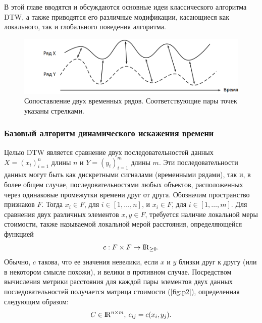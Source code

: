\documentclass[a4paper, 14pt]{extarticle}
\numberwithin{figure}{subsection}
\let\oldautoref\autoref
\renewcommand{\autoref}[1]{(\oldautoref{#1})}
\numberwithin{equation}{subsection}
\begin{document}
В этой главе вводятся и обсуждаются основные идеи классического алгоритма DTW, а также приводятся его различные модификации, касающиеся как локального, так и глобального поведения алгоритма.

\begin{figure}[h]
\centering
\includegraphics[width=15cm]{p1.png}
\caption{Сопоставление двух временных рядов. Соответствующие пары точек указаны стрелками.}
\label{fig:p1}
\end{figure}

\subsubsection{Базовый алгоритм динамического искажения времени}
Целью DTW является сравнение двух последовательностей данных $X = (x_i)_{i=1}^n$ длины $n$ и $Y = (y_i)_{i=1}^m$ длины $m$. Эти последовательности данных могут быть как дискретными сигналами (временными рядами), так и, в более общем случае, последовательностями любых объектов, расположенных через одинаковые промежутки времени друг от друга. Обозначим пространство признаков $F$. Тогда $x_i \in F$, для $i \in [1, \dots, n]$, и $x_i \in F$, для $i \in [1, \dots, m]$. Для сравнения двух различных элементов $x, y \in F$, требуется наличие локальной меры стоимости, также называемой локальной мерой расстояния, определяющейся функцией
\begin{equation}
	c: F \times F \rightarrow {\rm I\!R}_{\ge 0}.
\end{equation}
Обычно, $c$ такова, что ее значения невелики, если $x$ и $y$ близки друг к другу (или в некотором смысле похожи), и велики в противном случае. Посредством вычисления метрики расстояния для каждой пары элементов двух данных последовательностей получается матрица стоимости \autoref{fig:p2}, определенная следующим образом:
\begin{equation}
	C \in {\rm I\!R}^{n \times m},\> c_{ij} = c(x_i, y_j).
\end{equation}
\end{document}
